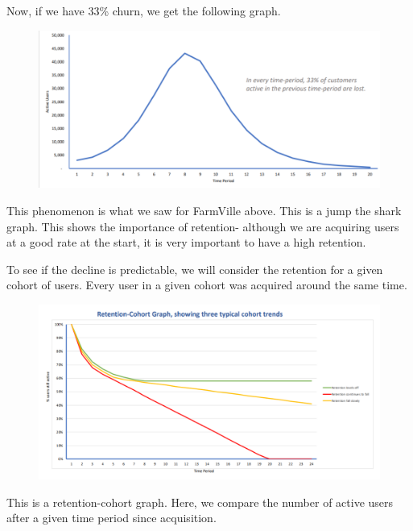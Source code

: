 \documentclass[a4paper, openany]{memoir}
\begin{document}
Now, if we have 33\% churn, we get the following graph.
\begin{figure}[H]
    \centering
    \includegraphics[scale=0.55]{src/18.13 33 Churn.PNG}
\end{figure}
\noindent This phenomenon is what we saw for FarmVille above. This is a jump the shark graph. This shows the importance of retention- although we are acquiring users at a good rate at the start, it is very important to have a high retention.

To see if the decline is predictable, we will consider the retention for a given cohort of users. Every user in a given cohort was acquired around the same time.
\begin{figure}[H]
    \centering
    \includegraphics[scale=0.5]{src/18.14 Retention Cohort Graph.PNG}
\end{figure}
\noindent This is a retention-cohort graph. Here, we compare the number of active users after a given time period since acquisition.
\end{document}
